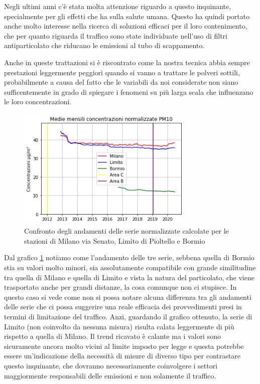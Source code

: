 \documentclass[a4paper,12pt]{report}
\begin{document}
Negli ultimi anni c'è stata molta attenzione riguardo a questo inquinante, specialmente per gli effetti che ha sulla salute umana.
Questo ha quindi portato anche molto interesse nella ricerca di soluzioni efficaci per il loro contenimento, che per quanto riguarda il traffico sono state individuate nell'uso di filtri antiparticolato che riducano le emissioni al tubo di scappamento. 

Anche in queste trattazioni si è riscontrato come la nostra tecnica abbia sempre prestazioni leggermente peggiori quando si vanno a trattare le polveri sottili, probabilmente a causa del fatto che le variabili da noi considerate non siano sufficentemente in grado di spiegare i fenomeni su più larga scala che influenzano le loro concentrazioni.

\begin{figure}[h]
\centering
\includegraphics[width=0.75\textwidth]{pm10_traffico}
\caption{Confronto degli andamenti delle serie normalizzate calcolate per le stazioni di Milano via Senato, Limito di Pioltello e Bormio}
\label{fig:pm10_traffico}
\end{figure}

Dal grafico \ref{fig:pm10_traffico} notiamo come l'andamento delle tre serie, sebbena quella di Bormio stia su valori molto minori, sia assolutamente compatibile con grande similitudine tra quella di Milano e quella di Limito e vista la natura del particolato, che viene trasportato anche per grandi distanze, la cosa comunque non ci stupisce. In questo caso si vede come non si possa notare alcuna differenza tra gli andamenti delle serie che ci possa suggerire una reale efficacia dei provvedimenti presi in termini di limitazione del traffico. Anzi, guardando il grafico ottenuto, la serie di Limito (non coinvolto da nessuna misura) risulta calata leggermente di più rispetto a quella di Milano.
Il trend ricavato è calante ma i valori sono sicuramente ancora molto vicini al limite imposto per legge e questa potrebbe essere un'indicazione della necessità di misure di diverso tipo per contrastare questo inquinante, che dovranno necessariamente coinvolgere i settori maggiormente responsabili delle emissioni e non solamente il traffico.
\end{document}
